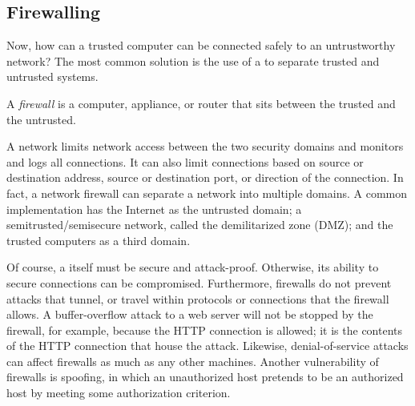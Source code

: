 \subsection{Firewalling}\label{subsec:Firewalling}
Now, how can a trusted computer can be connected safely to an untrustworthy network?
The most common solution is the use of a  to separate trusted and untrusted systems.

\begin{definition}[Firewall]\label{def:Firewall}
  A \emph{firewall} is a computer, appliance, or router that sits between the trusted and the untrusted.
\end{definition}

A network  limits network access between the two security domains and monitors and logs all connections.
It can also limit connections based on source or destination address, source or destination port, or direction of the connection.
In fact, a network firewall can separate a network into multiple domains.
A common implementation has the Internet as the untrusted domain; a semitrusted/semisecure network, called the demilitarized zone (DMZ); and the trusted computers as a third domain.

Of course, a  itself must be secure and attack-proof.
Otherwise, its ability to secure connections can be compromised.
Furthermore, firewalls do not prevent attacks that tunnel, or travel within protocols or connections that the firewall allows.
A buffer-overflow attack to a web server will not be stopped by the firewall, for example, because the HTTP connection is allowed; it is the contents of the HTTP connection that house the attack.
Likewise, denial-of-service attacks can affect firewalls as much as any other machines.
Another vulnerability of firewalls is spoofing, in which an unauthorized host pretends to be an authorized host by meeting some authorization criterion.

